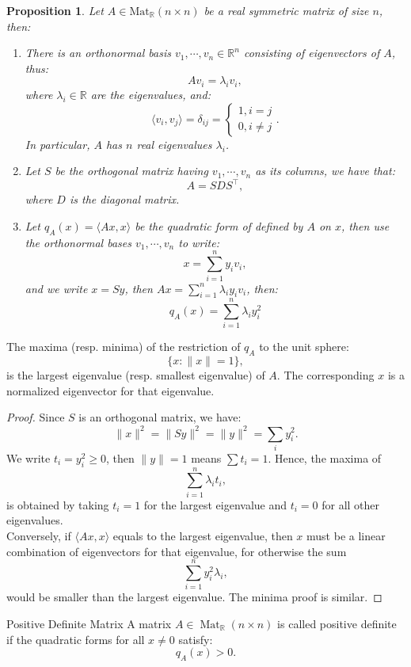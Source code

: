 \documentclass[11pt]{article}
\makeatletter
\newcounter{thmcounter}
\newenvironment{definition}[1]{\begin{defbox}{#1}{}}{\end{defbox}}
\newenvironment{theorem}[1]{\begin{thmbox}{#1}{}}{\end{thmbox}}
\theoremstyle{quiet}
\newtheorem{proposition}[thmcounter]{Proposition}
\newtheorem{proposition}[tcb@cnt@defbox]{Proposition}
\theoremstyle{quietremark}
\makeatother
\begin{document}
\begin{proposition}
Let $A\in\operatorname{Mat_\mathbb{R}}(n\times n)$ be a real symmetric matrix of size $n$, then:
\begin{enumerate}
\item There is an orthonormal basis $v_1,\cdots,v_n\in\mathbb{R}^n$ consisting of eigenvectors of $A$, thus:
\[
Av_i=\lambda_iv_i,
\]
where $\lambda_i\in\mathbb{R}$ are the eigenvalues, and:
\[
\langle v_i,v_j\rangle=\delta_{ij}=\begin{cases}1,i=j\\0,i\ne j\end{cases}.
\]
In particular, $A$ has $n$ real eigenvalues $\lambda_i$.

\item Let $S$ be the orthogonal matrix having $v_1,\cdots,v_n$ as its columns, we have that:
\[
A=SDS^\top,
\]
where $D$ is the diagonal matrix.

\item Let $q_A(x)=\langle Ax,x\rangle$ be the quadratic form of defined by $A$ on $x$, then use the orthonormal bases $v_1,\cdots,v_n$ to write:
\[
x=\sum_{i=1}^ny_iv_i,
\]
and we write $x=Sy$, then $Ax=\sum_{i=1}^n\lambda_iy_iv_i$, then:
\[
q_A(x)=\sum_{i=1}^n \lambda_iy_i^2
\]
\end{enumerate}
\end{proposition}

\begin{theorem}{}
The maxima (resp. minima) of the restriction of $q_A$ to the unit sphere:
\[
\{x:\|x\|=1\},
\]
is the largest eigenvalue (resp. smallest eigenvalue) of $A$. The corresponding $x$ is a normalized eigenvector for that eigenvalue.
\end{theorem}

\begin{proof}
Since $S$ is an orthogonal matrix, we have:
\[
\|x\|^2=\|Sy\|^2=\|y\|^2=\sum_iy_i^2.
\]
We write $t_i=y_i^2\ge 0$, then $\|y\|=1$ means $\sum t_i=1$. Hence, the maxima of 
\[
\sum_{i=1}^n\lambda_it_i,
\]is obtained by taking $t_i=1$ for the largest eigenvalue and $t_i=0$ for all other eigenvalues. \\
Conversely, if $\langle Ax,x\rangle$ equals to the largest eigenvalue, then $x$ must be a linear combination of eigenvectors for that eigenvalue, for otherwise the sum 
\[
\sum_{i=1}^ny_i^2\lambda_i,
\] would be smaller than the largest eigenvalue. The minima proof is similar.
\end{proof}

\begin{definition}{Positive Definite Matrix}
A matrix $A\in\operatorname{Mat}_\mathbb{R}(n\times n)$ is called positive definite if the quadratic forms for all $x\ne 0$ satisfy:
\[
q_A(x)>0.
\]
\end{definition}
\end{document}
